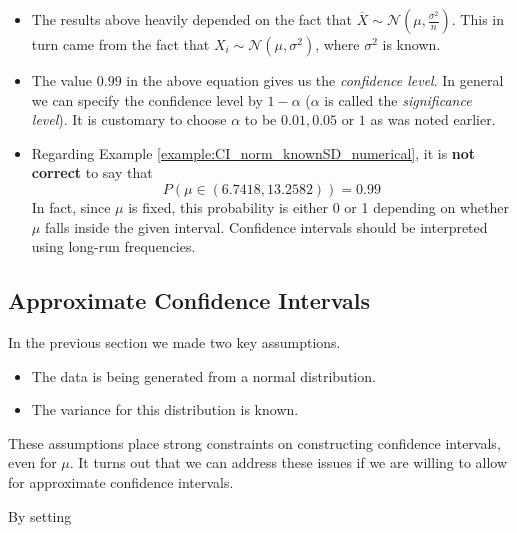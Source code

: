 \note

\begin{itemize}
    \item The results above heavily depended on the fact that $\overline{X} \sim \mathcal{N}(\mu, \frac{\sigma^2}{n})$. This in turn came from the fact that $X_i \sim \mathcal{N}(\mu, \sigma^2)$, where $\sigma^2$ is known.
    \item The value $0.99$ in the above equation gives us the \textit{confidence level}. In general we can specify the confidence level by $1- \alpha$ ($\alpha$ is called the \textit{significance level}). It is customary to choose $\alpha$ to be $0.01, 0.05$ or $1$ as was noted earlier.
    \item Regarding Example \ref{example:CI_norm_knownSD_numerical}, it is \textbf{not correct} to say that 
    \[
    P(\mu \in (6.7418, 13.2582)) = 0.99
    \]
    In fact, since $\mu$ is fixed, this probability is either 0 or 1 depending on whether $\mu$ falls inside the given interval. Confidence intervals should be interpreted using long-run frequencies.
\end{itemize}

\subsection{Approximate Confidence Intervals}

In the previous section we made two key assumptions.
\begin{itemize}
    \item The data is being generated from a normal distribution.
    \item The variance for this distribution is known.
\end{itemize}

These assumptions place strong constraints on constructing confidence intervals, even for $\mu$. It turns out that we can address these issues if we are willing to allow for approximate confidence intervals.


By setting
\[

\]
